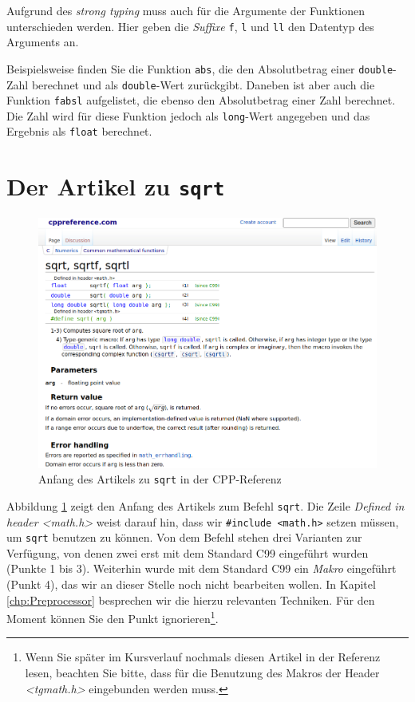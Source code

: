 Aufgrund des \emph{strong typing} muss auch für die Argumente der Funktionen unterschieden werden. Hier geben die \emph{Suffixe} \texttt{f}, \texttt{l} und \texttt{ll} den Datentyp des Arguments an.

Beispielsweise finden Sie die Funktion \texttt{abs}, die den Absolutbetrag einer \texttt{double}-Zahl berechnet und als \texttt{double}-Wert zurückgibt. Daneben ist aber auch \ua die Funktion \texttt{fabsl} aufgelistet, die ebenso den Absolutbetrag einer Zahl berechnet. Die Zahl wird für diese Funktion jedoch als \texttt{long}-Wert angegeben und das Ergebnis als \texttt{float} berechnet.

\section{Der Artikel zu \texttt{sqrt}} \label{sec:cpp-article}
\begin{figure}[h!]
	\includegraphics[width=\linewidth]{./gfx/cpp-sqrt}
	\caption{Anfang des Artikels zu \texttt{sqrt} in der CPP-Referenz} \label{fig:cpp-sqrt}
\end{figure}

Abbildung \ref{fig:cpp-sqrt} zeigt den Anfang des Artikels zum Befehl \texttt{sqrt}. Die Zeile \emph{Defined in header <math.h>} weist darauf hin, dass wir \texttt{#include <math.h>} setzen müssen, um \texttt{sqrt} benutzen zu können. Von dem Befehl stehen drei Varianten zur Verfügung, von denen zwei erst mit dem Standard C99 eingeführt wurden (Punkte 1 bis 3). Weiterhin wurde mit dem Standard C99 ein \emph{Makro} eingeführt (Punkt 4), das wir an dieser Stelle noch nicht bearbeiten wollen. In Kapitel \ref{chp:Preprocessor} besprechen wir die hierzu relevanten Techniken. Für den Moment können Sie den Punkt ignorieren\footnote{Wenn Sie später im Kursverlauf nochmals diesen Artikel in der Referenz lesen, beachten Sie bitte, dass für die Benutzung des Makros der Header \emph{<tgmath.h>} eingebunden werden muss.}.

